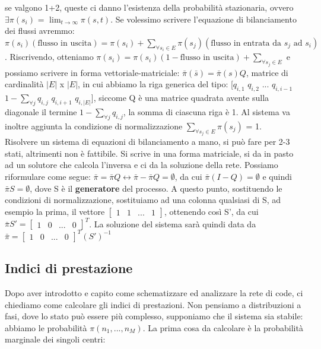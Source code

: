 \documentclass{article}
\begin{document}
se valgono 1+2, queste ci danno l'esistenza della probabilità stazionaria, ovvero $\exists \pi(s_i)$ = $\displaystyle{\lim_{t \to \infty} \pi(s,t)}$. Se volessimo scrivere l'equazione di bilanciamento dei flussi avremmo: $\pi(s_i)(\text{flusso in uscita}) = \pi(s_i) +  \sum\limits_{\forall s_i \in E} \pi(s_j)(\text{flusso in entrata da } s_j \text{ ad } s_i)$. Riscrivendo, otteniamo $\pi(s_i) = \pi(s_i)(1 - \text{flusso in uscita}) + \sum\limits_{\forall s_j \in E}$ e possiamo scrivere in forma vettoriale-matriciale: $\bar{\pi}(\bar{s}) = \bar{\pi}(s) Q$, matrice di cardinalità $|E|$ x $|E|$, in cui abbiamo la riga generica del tipo: [$q_{i,1}$ $q_{i,2}$ ... $q_{i,i-1}$ $1 - \sum\limits_{\forall j} q_{i,j}$ $q_{i, i+1}$ $q_{i, |E|}$], siccome Q è una matrice quadrata avente sulla diagonale il termine $1 - \sum\limits_{\forall j} q_{i,j}$, la somma di ciascuna riga è 1. Al sistema va inoltre aggiunta la condizione di normalizzazione $\sum\limits_{\forall s_j \in E} \pi(s_j)$ = 1.\\ Risolvere un sistema di equazioni di bilanciamento a mano, si può fare per 2-3 stati, altrimenti non è fattibile. Si scrive in una forma matriciale, si da in pasto ad un solutore che calcola l'inversa e ci da la soluzione della rete. Possiamo riformulare come segue: $\bar{\pi} = \bar{\pi} Q \leftrightarrow \bar{\pi} - \bar{\pi} Q = \emptyset$, da cui $\bar{\pi}(I - Q) = \emptyset$ e quindi $\bar{\pi}S = \emptyset$, dove S è il \textbf{generatore} del processo. A questo punto, sostituendo le condizioni di normalizzazione, sostituiamo ad una colonna qualsiasi di S, ad esempio la prima, il vettore $\begin{bmatrix} 1 & 1 & ... & 1\end{bmatrix}$,  ottenendo così S', da cui $\bar{\pi}S' = \begin{bmatrix} 1 & 0 & ... & 0\end{bmatrix}^T$. La soluzione del sistema sarà quindi data da $\bar{\pi} = \begin{bmatrix} 1 & 0 & ... & 0\end{bmatrix}^T (S')^{-1}$
\subsection{Indici di prestazione} 
Dopo aver introdotto e capito come schematizzare ed analizzare la rete di code, ci chiediamo come calcolare gli indici di prestazioni. Non pensiamo a distribuzioni a fasi, dove lo stato può essere più complesso, supponiamo che il sistema sia stabile: abbiamo le probabilità $\pi(n_1,...,n_M)$. La prima cosa da calcolare è la probabilità marginale dei singoli centri:
\end{document}
